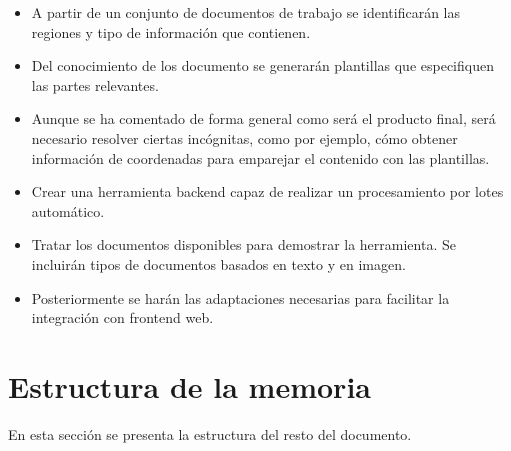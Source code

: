 \begin{itemize}
    \item A partir de un conjunto de documentos de trabajo se identificarán las regiones y tipo de información que contienen.
    \item Del conocimiento de los documento se generarán plantillas que especifiquen las partes relevantes.
    \item Aunque se ha comentado de forma general como será el producto final, será necesario resolver ciertas incógnitas, como por ejemplo, cómo obtener información de coordenadas para emparejar el contenido con las plantillas.
    \item Crear una herramienta backend capaz de realizar un procesamiento por lotes automático.
    \item Tratar los documentos disponibles para demostrar la herramienta. Se incluirán tipos de documentos basados en texto y en imagen.
    \item Posteriormente se harán las adaptaciones necesarias para facilitar la integración con frontend web.
\end{itemize}

\section{Estructura de la memoria}

En esta sección se presenta la estructura del resto del documento.

